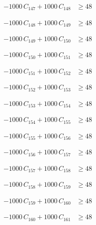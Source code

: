 \documentclass[a4paper,11pt]{article}
\begin{document}
\begin{align}
-1000\,C_{147} + 1000\,C_{148} &\geq 48 \nonumber
\end{align}

\begin{align}
-1000\,C_{148} + 1000\,C_{149} &\geq 48 \nonumber
\end{align}

\begin{align}
-1000\,C_{149} + 1000\,C_{150} &\geq 48 \nonumber
\end{align}

\begin{align}
-1000\,C_{150} + 1000\,C_{151} &\geq 48 \nonumber
\end{align}

\begin{align}
-1000\,C_{151} + 1000\,C_{152} &\geq 48 \nonumber
\end{align}

\begin{align}
-1000\,C_{152} + 1000\,C_{153} &\geq 48 \nonumber
\end{align}

\begin{align}
-1000\,C_{153} + 1000\,C_{154} &\geq 48 \nonumber
\end{align}

\begin{align}
-1000\,C_{154} + 1000\,C_{155} &\geq 48 \nonumber
\end{align}

\begin{align}
-1000\,C_{155} + 1000\,C_{156} &\geq 48 \nonumber
\end{align}

\begin{align}
-1000\,C_{156} + 1000\,C_{157} &\geq 48 \nonumber
\end{align}

\begin{align}
-1000\,C_{157} + 1000\,C_{158} &\geq 48 \nonumber
\end{align}

\begin{align}
-1000\,C_{158} + 1000\,C_{159} &\geq 48 \nonumber
\end{align}

\begin{align}
-1000\,C_{159} + 1000\,C_{160} &\geq 48 \nonumber
\end{align}

\begin{align}
-1000\,C_{160} + 1000\,C_{161} &\geq 48 \nonumber
\end{align}
\end{document}
